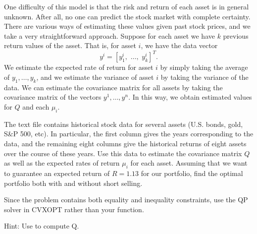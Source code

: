 One difficulty of this model is that the risk and return of each asset is in general unknown.
After all, no one can predict the stock market with complete certainty.
There are various ways of estimating these values given past stock prices, and we take a very straightforward approach.
Suppose for each asset we have $k$ previous return values of the asset. That is, for asset $i$, we have the data vector\[y^i = [y^i_1,\,\, \ldots, \,\,y^i_k]^T.\]
We estimate the expected rate of return for asset $i$ by simply taking the average of $y_1,\ldots,y_k$, and we estimate the variance
of asset $i$ by taking the variance of the data.
We can estimate the covariance matrix for all assets by taking the covariance matrix of the vectors $y^1,\ldots,y^n$.
In this way, we obtain estimated values for $Q$ and each $\mu_i$.

\begin{problem}
The text file  contains historical stock data for several assets (U.S. bonds, gold, S\&P 500, etc).
In particular, the first column gives the years corresponding to the data, and the remaining eight columns give the historical returns
of eight assets over the course of these years.
Use this data to estimate the covariance matrix $Q$ as well as the expected rates of return $\mu_i$ for each asset.
Assuming that we want to guarantee an expected return of $R = 1.13$ for our portfolio, find the optimal portfolio both with and without short selling.

Since the problem contains both equality and inequality constraints, use the QP solver in CVXOPT rather than your  function.

Hint: Use  to compute Q.
\end{problem} 
